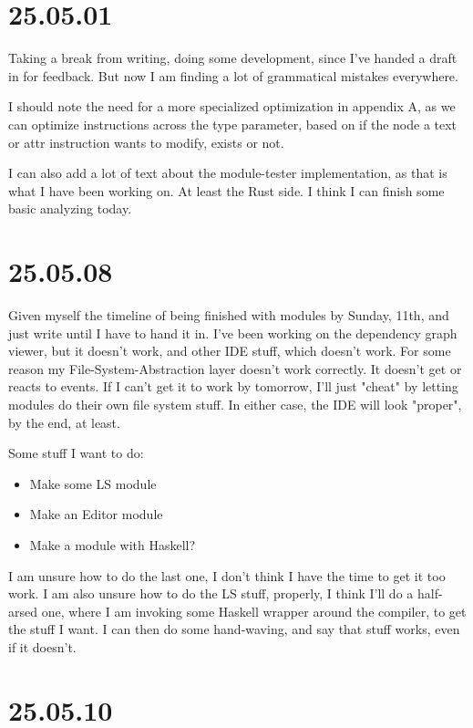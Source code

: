 \section{25.05.01}

Taking a break from writing, doing some development, since I've handed a draft
in for feedback. But now I am finding a lot of grammatical mistakes everywhere.

I should note the need for a more specialized optimization in appendix A, as
we can optimize instructions across the type parameter, based on if the node a
text or attr instruction wants to modify, exists or not.

I can also add a lot of text about the module-tester implementation, as that is
what I have been working on. At least the Rust side. I think I can finish some
basic analyzing today.

\section{25.05.08}

Given myself the timeline of being finished with modules by Sunday, 11th, and
just write until I have to hand it in. I've been working on the dependency graph
viewer, but it doesn't work, and other IDE stuff, which doesn't work. For some
reason my File-System-Abstraction layer doesn't work correctly. It doesn't get
or reacts to events. If I can't get it to work by tomorrow, I'll just "cheat" by
letting modules do their own file system stuff. In either case, the IDE will
look "proper", by the end, at least.

Some stuff I want to do:

\begin{itemize}
  \item Make some LS module
  \item Make an Editor module
  \item Make a module with Haskell?
\end{itemize}

I am unsure how to do the last one, I don't think I have the time to get it too
work. I am also unsure how to do the LS stuff, properly, I think I'll do a
half-arsed one, where I am invoking some Haskell wrapper around the compiler,
to get the stuff I want. I can then do some hand-waving, and say that stuff
works, even if it doesn't.


\section{25.05.10}

